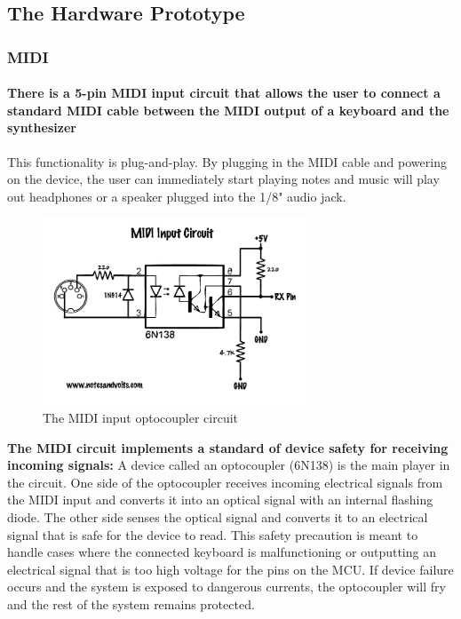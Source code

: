 \documentclass[acmlarge,screen]{acmart}
\begin{document}

\subsection{The Hardware Prototype}
	\subsubsection{MIDI}
	\paragraph{There is a 5-pin MIDI input circuit that allows the user to connect a standard MIDI cable between the MIDI output of a keyboard and the synthesizer} This functionality is plug-and-play. By plugging in the MIDI cable and powering on the device, the user can immediately start playing notes and music will play out headphones or a speaker  plugged into the 1/8" audio jack.
	
	\begin{figure}
		\includegraphics[width=8cm]{midi_optocoupler_circuit}
		\caption{The MIDI input optocoupler circuit}
		\centering
	\end{figure}

	\textbf{The MIDI circuit implements a standard of device safety for receiving incoming signals:} A device called an optocoupler (6N138) is the main player in the circuit. One side of the optocoupler receives incoming electrical signals from the MIDI input and converts it into an optical signal with an internal flashing diode. The other side senses the optical signal and converts it to an electrical signal that is safe for the device to read. This safety precaution is meant to handle cases where the connected keyboard is malfunctioning or outputting an electrical signal that is too high voltage for the pins on the MCU. If device failure occurs and the system is exposed to dangerous currents, the optocoupler will fry and the rest of the system remains protected. \cite{notesandvolts}
	
\end{document}
